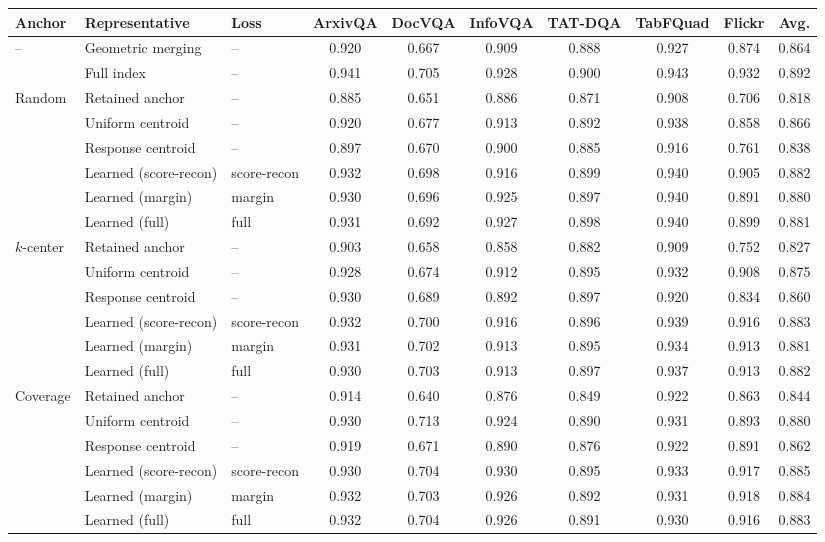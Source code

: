 \begin{tabular}{lllccccccc}
\toprule
Anchor & Representative & Loss & ArxivQA & DocVQA & InfoVQA & TAT-DQA & TabFQuad & Flickr & Avg. \\
\midrule
-- & Geometric merging & -- & 0.920 & 0.667 & 0.909 & 0.888 & 0.927 & 0.874 & 0.864 \\
 & Full index & -- & 0.941 & 0.705 & 0.928 & 0.900 & 0.943 & 0.932 & 0.892 \\
\midrule
Random & Retained anchor & -- & 0.885 & 0.651 & 0.886 & 0.871 & 0.908 & 0.706 & 0.818 \\
 & Uniform centroid & -- & 0.920 & 0.677 & 0.913 & 0.892 & 0.938 & 0.858 & 0.866 \\
 & Response centroid & -- & 0.897 & 0.670 & 0.900 & 0.885 & 0.916 & 0.761 & 0.838 \\
 & Learned (score-recon) & score-recon & 0.932 & 0.698 & 0.916 & 0.899 & 0.940 & 0.905 & 0.882 \\
 & Learned (margin) & margin & 0.930 & 0.696 & 0.925 & 0.897 & 0.940 & 0.891 & 0.880 \\
 & Learned (full) & full & 0.931 & 0.692 & 0.927 & 0.898 & 0.940 & 0.899 & 0.881 \\
\midrule
$k$-center & Retained anchor & -- & 0.903 & 0.658 & 0.858 & 0.882 & 0.909 & 0.752 & 0.827 \\
 & Uniform centroid & -- & 0.928 & 0.674 & 0.912 & 0.895 & 0.932 & 0.908 & 0.875 \\
 & Response centroid & -- & 0.930 & 0.689 & 0.892 & 0.897 & 0.920 & 0.834 & 0.860 \\
 & Learned (score-recon) & score-recon & 0.932 & 0.700 & 0.916 & 0.896 & 0.939 & 0.916 & 0.883 \\
 & Learned (margin) & margin & 0.931 & 0.702 & 0.913 & 0.895 & 0.934 & 0.913 & 0.881 \\
 & Learned (full) & full & 0.930 & 0.703 & 0.913 & 0.897 & 0.937 & 0.913 & 0.882 \\
\midrule
Coverage & Retained anchor & -- & 0.914 & 0.640 & 0.876 & 0.849 & 0.922 & 0.863 & 0.844 \\
 & Uniform centroid & -- & 0.930 & 0.713 & 0.924 & 0.890 & 0.931 & 0.893 & 0.880 \\
 & Response centroid & -- & 0.919 & 0.671 & 0.890 & 0.876 & 0.922 & 0.891 & 0.862 \\
 & Learned (score-recon) & score-recon & 0.930 & 0.704 & 0.930 & 0.895 & 0.933 & 0.917 & 0.885 \\
 & Learned (margin) & margin & 0.932 & 0.703 & 0.926 & 0.892 & 0.931 & 0.918 & 0.884 \\
 & Learned (full) & full & 0.932 & 0.704 & 0.926 & 0.891 & 0.930 & 0.916 & 0.883 \\
\bottomrule
\end{tabular}